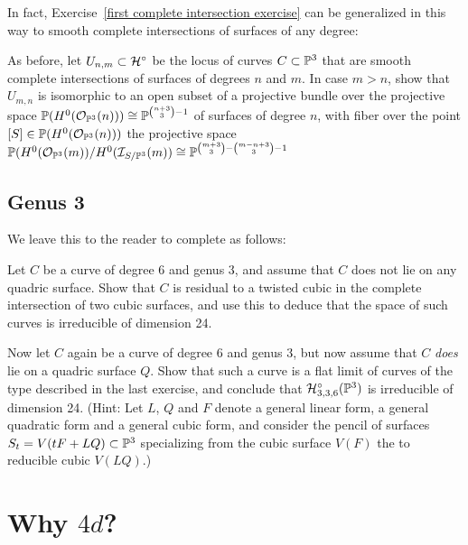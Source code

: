 In fact, Exercise~\ref{first complete intersection exercise} can be generalized in this way to smooth complete intersections of surfaces of any degree:

\begin{exercise}\label{second complete intersection exercise}
As before, let $U_{n,m} \subset \cH^\circ$ be the locus of curves $C \subset \PP^3$ that are smooth complete intersections of surfaces of degrees $n$ and $m$.
 In case $m > n$, show that $U_{m,n}$ is isomorphic to an open subset of a projective bundle over the projective space $\PP(H^0(\cO_{\PP^3}(n))) \cong \PP^{\binom{n+3}{3}-1}$ of surfaces of degree $n$, with fiber over the point $[S] \in \PP(H^0(\cO_{\PP^3}(n)))$ the projective space $\PP(H^0(\cO_{\PP^3}(m))/H^0(\cI_{S/\PP^3}(m)) \cong \PP^{\binom{m+3}{3} - \binom{m-n+3}{3} - 1}$ 
\end{exercise}


\subsection{Genus 3}
We leave this to the reader to complete as follows:

\begin{exercise}
Let $C$ be a curve of degree 6 and genus 3, and assume that $C$ does not lie on any quadric surface. Show that $C$ is residual to a twisted cubic in the complete intersection of two cubic surfaces, and use this to deduce that the space of such curves is irreducible of dimension 24.
\end{exercise}


\begin{exercise}
Now let $C$ again be a curve of degree 6 and genus 3, but now assume that $C$ \emph{does} lie on a quadric surface $Q$. Show that such a curve is a flat limit of curves of the type described in the last exercise, and conclude that $\cH^\circ_{3,3,6}(\PP^3)$ is irreducible of dimension 24. (Hint: Let $L$, $Q$ and $F$ denote a general linear form, a general quadratic form and a general cubic form, and consider the pencil of surfaces $S_t = V(tF + LQ) \subset \PP^3$ specializing from the cubic surface $V(F)$ the to reducible cubic $V(LQ)$.)

\end{exercise}



\section{Why  $4d$?}\label{estimating dim hilb}

